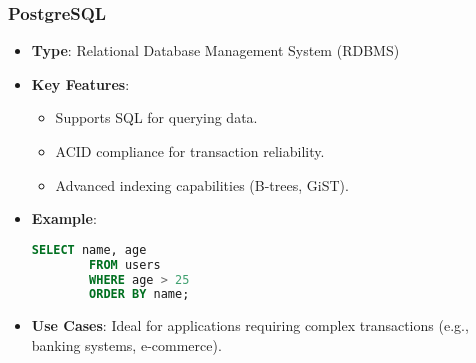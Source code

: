 \documentclass[aspectratio=169]{beamer}
\begin{document}
\begin{frame}[fragile]
    \frametitle{PostgreSQL}
    \begin{itemize}
        \item \textbf{Type}: Relational Database Management System (RDBMS)
        \item \textbf{Key Features}:
        \begin{itemize}
            \item Supports SQL for querying data.
            \item ACID compliance for transaction reliability.
            \item Advanced indexing capabilities (B-trees, GiST).
        \end{itemize}
        \item \textbf{Example}:
        \begin{lstlisting}[language=SQL]
        SELECT name, age 
        FROM users 
        WHERE age > 25 
        ORDER BY name;
        \end{lstlisting}
        \item \textbf{Use Cases}: Ideal for applications requiring complex transactions (e.g., banking systems, e-commerce).
    \end{itemize}
\end{frame}
\end{document}
